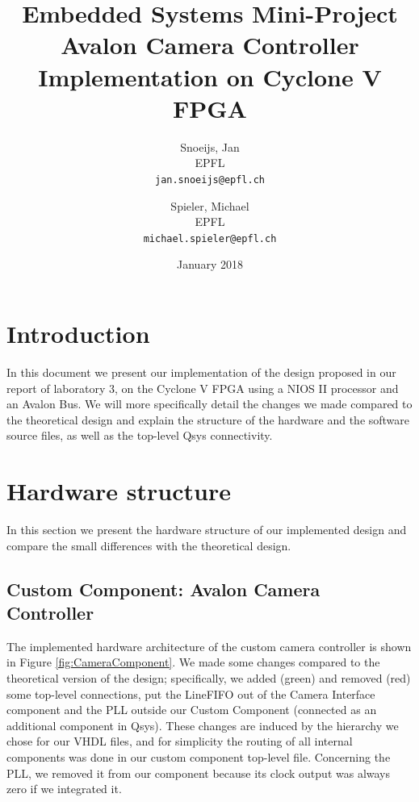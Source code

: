 \documentclass{article}
\title{Embedded Systems Mini-Project\\
 Avalon Camera Controller Implementation on Cyclone V FPGA}
\author{
  Snoeijs, Jan\\
  EPFL\\
  \texttt{jan.snoeijs@epfl.ch}
  \and
  Spieler, Michael\\
  EPFL\\
  \texttt{michael.spieler@epfl.ch}
  }
\date{January 2018}
\begin{document}
\maketitle

\section{Introduction}
In this document we present our implementation of the design proposed in our report of laboratory 3, on the Cyclone V FPGA using a NIOS II processor and an Avalon Bus. We will more specifically detail the changes we made compared to the theoretical design and explain the structure of the hardware and the software source files, as well as the top-level Qsys connectivity.

\section{Hardware structure}

In this section we present the hardware structure of our implemented design and compare the small differences with the theoretical design.

\subsection{Custom Component: Avalon Camera Controller}

The implemented hardware architecture of the custom camera controller is shown in Figure \ref{fig:CameraComponent}. We made some changes compared to the theoretical version of the design; specifically, we added (green) and removed (red) some top-level connections, put the LineFIFO out of the Camera Interface component and the PLL outside our Custom Component (connected as an additional component in Qsys). These changes are induced by the hierarchy we chose for our VHDL files, and for simplicity the routing of all internal components was done in our custom component top-level file. Concerning the PLL, we removed it from our component because its clock output was always zero if we integrated it.
\end{document}
